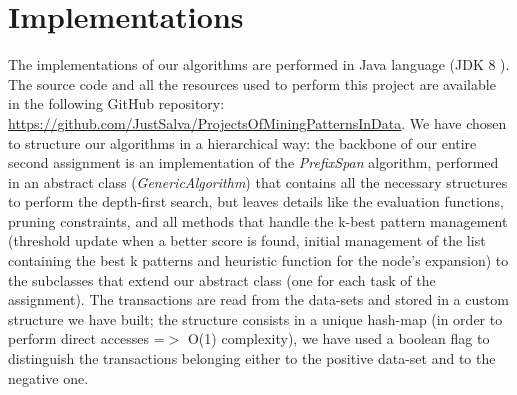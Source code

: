 \documentclass[10pt, a4paper]{article}
\begin{document}
	\section{Implementations}
	The implementations of our algorithms are performed in Java language (JDK 8 ).
	The source code and all the resources used to perform this project are available in the following GitHub repository: \url{https://github.com/JustSalva/ProjectsOfMiningPatternsInData}.\newline\newline
	We have chosen to structure our algorithms in a hierarchical way: the backbone of our entire second assignment is an implementation of the \textit{PrefixSpan} algorithm, performed in an abstract class (\textit{GenericAlgorithm}) that contains all the necessary structures to perform the depth-first search, but leaves details like the evaluation functions, pruning constraints, and all methods that handle the k-best pattern management (threshold update when a better score is found, initial management of the list containing the best k patterns and heuristic function for the node's expansion) to the subclasses that extend our abstract class (one for each task of the assignment).
	The transactions are read from the data-sets and stored in a custom structure we have built; the structure consists in a unique hash-map (in order to perform direct accesses =$>$ O(1) complexity), we have used a boolean flag to distinguish the transactions belonging either to the positive data-set and to the negative one.\newline
\end{document}
